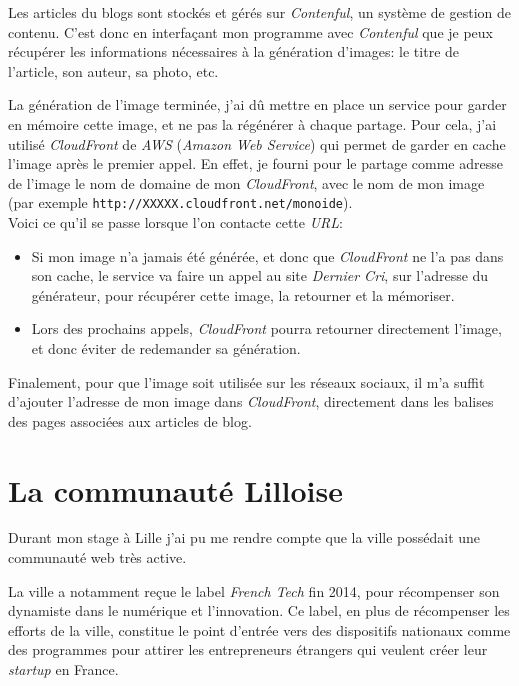 \bigskip

Les articles du blogs sont stockés et gérés sur \emph{Contenful}, un
système de gestion de contenu. C'est donc en interfaçant mon programme
avec \emph{Contenful} que je peux récupérer les informations nécessaires
à la génération d'images: le titre de l'article, son auteur, sa photo,
etc.

\bigskip

La génération de l'image terminée, j'ai dû mettre en place un service
pour garder en mémoire cette image, et ne pas la régénérer à chaque
partage. Pour cela, j'ai utilisé \emph{CloudFront} de \emph{AWS}
(\emph{Amazon Web Service}) qui permet de garder en cache l'image après
le premier appel. En effet, je fourni pour le partage comme adresse de
l'image le nom de domaine de mon \emph{CloudFront}, avec le nom de mon
image (par exemple \texttt{http://XXXXX.cloudfront.net/monoide}).\\
Voici ce qu'il se passe lorsque l'on contacte cette \emph{URL}:

\begin{itemize}
\item
  Si mon image n'a jamais été générée, et donc que \emph{CloudFront} ne
  l'a pas dans son cache, le service va faire un appel au site
  \emph{Dernier Cri}, sur l'adresse du générateur, pour récupérer cette
  image, la retourner et la mémoriser.
\item
  Lors des prochains appels, \emph{CloudFront} pourra retourner
  directement l'image, et donc éviter de redemander sa génération.
\end{itemize}

\bigskip

Finalement, pour que l'image soit utilisée sur les réseaux sociaux, il
m'a suffit d'ajouter l'adresse de mon image dans \emph{CloudFront},
directement dans les balises des pages associées aux articles de blog.

\newpage

\section{La communauté Lilloise}\label{la-communautuxe9-lilloise}

Durant mon stage à Lille j'ai pu me rendre compte que la ville possédait
une communauté web très active.

\bigskip

La ville a notamment reçue le label \emph{French Tech} fin 2014, pour
récompenser son dynamiste dans le numérique et l'innovation. Ce label,
en plus de récompenser les efforts de la ville, constitue le point
d'entrée vers des dispositifs nationaux comme des programmes pour
attirer les entrepreneurs étrangers qui veulent créer leur
\emph{startup} en France.

